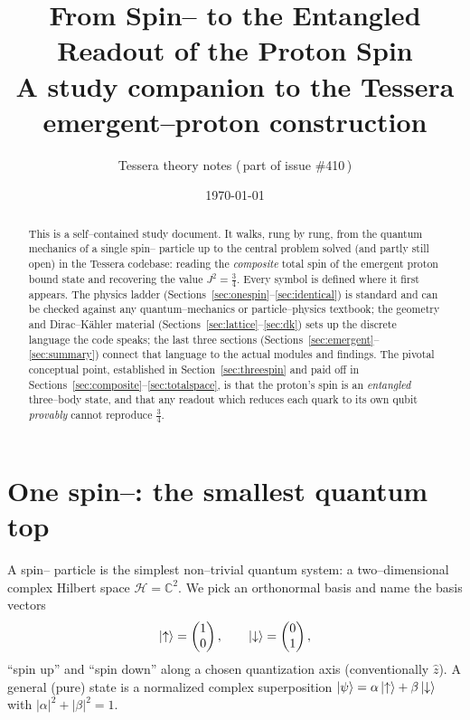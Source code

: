\documentclass[11pt,oneside]{article}
\title{\bfseries From Spin--\textonehalf{} to the Entangled Readout of the Proton Spin\\[4pt]
\large A study companion to the Tessera emergent--proton construction}
\author{Tessera theory notes \quad(\,part of issue \#410\,)}
\date{\today}
\newcommand{\C}{\mathbb{C}}
\newcommand{\up}{\uparrow}
\newcommand{\down}{\downarrow}
\begin{document}
\maketitle

\begin{abstract}
\noindent
This is a self--contained study document. It walks, rung by rung, from the
quantum mechanics of a single spin--\textonehalf{} particle up to the central
problem solved (and partly still open) in the Tessera codebase: reading the
\emph{composite} total spin of the emergent proton bound state and recovering
the value $J^2=\tfrac34$. Every symbol is defined where it first appears. The
physics ladder (Sections~\ref{sec:onespin}--\ref{sec:identical}) is standard
and can be checked against any quantum--mechanics or particle--physics
textbook; the geometry and Dirac--K\"ahler material
(Sections~\ref{sec:lattice}--\ref{sec:dk}) sets up the discrete language the
code speaks; the last three sections
(Sections~\ref{sec:emergent}--\ref{sec:summary}) connect that language to the
actual modules and findings. The pivotal conceptual point, established in
Section~\ref{sec:threespin} and paid off in
Sections~\ref{sec:composite}--\ref{sec:totalspace}, is that the proton's spin
is an \emph{entangled} three--body state, and that any readout which reduces
each quark to its own qubit \emph{provably} cannot reproduce $\tfrac34$.
\end{abstract}

\tableofcontents
\bigskip

\section{One spin--\textonehalf{}: the smallest quantum top}
\label{sec:onespin}

A spin--\textonehalf{} particle is the simplest non--trivial quantum system: a
two--dimensional complex Hilbert space $\mathcal H = \C^2$. We pick an
orthonormal basis and name the basis vectors
\begin{equation}
  \ket{\up} = \begin{pmatrix} 1 \\ 0 \end{pmatrix}, \qquad
  \ket{\down} = \begin{pmatrix} 0 \\ 1 \end{pmatrix},
\end{equation}
``spin up'' and ``spin down'' along a chosen quantization axis (conventionally
$\hat z$). A general (pure) state is a normalized complex superposition
$\ket{\psi} = \alpha\ket{\up} + \beta\ket{\down}$ with
$|\alpha|^2+|\beta|^2 = 1$.
\end{document}

